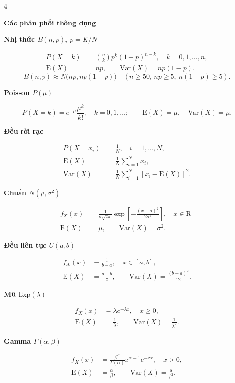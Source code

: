 \documentclass[a4paper,landscape]{article}
\newcommand{\sect}[1]{%
  \vspace{0.7pt}\noindent
  \colorbox{black!10}{\parbox{\dimexpr\linewidth-2\fboxsep\relax}{\bfseries #1}}%
  \vspace{0.2pt}\par}
\newcommand{\subsect}[1]{\vspace{0.2pt}\textbf{#1}\par}
\begin{document}
\fontsize{4.60}{4.90}\selectfont
\setlength{\abovedisplayskip}{0.25pt}
\setlength{\belowdisplayskip}{0.25pt}
\setlength{\abovedisplayshortskip}{0.15pt}
\setlength{\belowdisplayshortskip}{0.15pt}
\begin{multicols*}{4}

\sect{Các phân phối thông dụng}
\subsect{Nhị thức $B(n,p)$, $p=K/N$}
\[
 \begin{aligned}
 P(X=k)&=\binom nk p^k(1-p)^{n-k},\quad k=0,1,\ldots,n,\\
 \mathrm E(X)&=np,\qquad \mathrm{Var}(X)=np(1-p).
 \end{aligned}
\]
\[
 B(n,p)\approx N\bigl(np,np(1-p)\bigr)
 \quad(n\geq50,\ np\geq5,\ n(1-p)\geq5).
\]

\subsect{Poisson $P(\mu)$}
\[
 P(X=k)=e^{-\mu}\frac{\mu^k}{k!},\quad k=0,1,\ldots;\qquad
 \mathrm E(X)=\mu,\quad \mathrm{Var}(X)=\mu.
\]

\subsect{Đều rời rạc}
\[
 \begin{aligned}
 P(X=x_i)&=\frac1N,\quad i=1,\ldots,N,\\
 \mathrm E(X)&=\frac1N\sum_{i=1}^{N}x_i,\\
 \mathrm{Var}(X)&=\frac1N\sum_{i=1}^{N}[x_i-\mathrm E(X)]^2.
 \end{aligned}
\]

\subsect{Chuẩn $N(\mu,\sigma^2)$}
\[
 \begin{aligned}
 f_X(x)&=\frac1{\sigma\sqrt{2\pi}}
 \exp\!\left[-\frac{(x-\mu)^2}{2\sigma^2}\right],\quad x\in\mathrm R,\\
 \mathrm E(X)&=\mu,\qquad \mathrm{Var}(X)=\sigma^2.
 \end{aligned}
\]

\subsect{Đều liên tục $U(a,b)$}
\[
 \begin{aligned}
 f_X(x)&=\frac1{b-a},\quad x\in[a,b],\\
 \mathrm E(X)&=\frac{a+b}2,\qquad \mathrm{Var}(X)=\frac{(b-a)^2}{12}.
 \end{aligned}
\]

\subsect{Mũ $\text{Exp}(\lambda)$}
\[
 \begin{aligned}
 f_X(x)&=\lambda e^{-\lambda x},\quad x\ge0,\\
 \mathrm E(X)&=\frac1\lambda,\qquad \mathrm{Var}(X)=\frac1{\lambda^2}.
 \end{aligned}
\]

\subsect{Gamma $\Gamma(\alpha,\beta)$}
\[
 \begin{aligned}
 f_X(x)&=\frac{\beta^\alpha}{\Gamma(\alpha)} x^{\alpha-1} e^{-\beta x},\quad x>0,\\
 \mathrm E(X)&=\frac\alpha\beta,\qquad \mathrm{Var}(X)=\frac\alpha{\beta^2}.
 \end{aligned}
\]


\end{multicols*}
\end{document}
